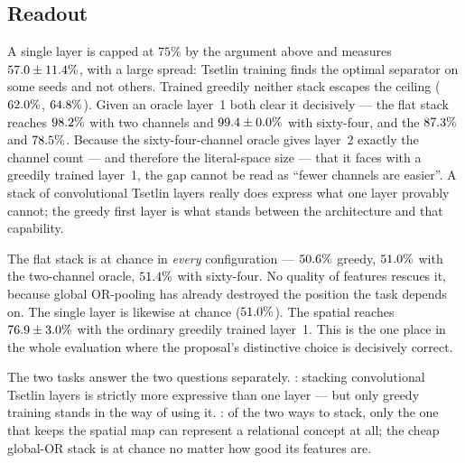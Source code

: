 \subsection{Readout}

 A single layer is capped at $75\%$ by the
argument above and measures $57.0{} \pm 11.4{}\%$, with a large
spread: Tsetlin training finds the optimal separator on some seeds and not others. Trained
greedily neither stack escapes the ceiling ($62.0{}\%$,
$64.8{}\%$). Given an oracle layer~1 both clear it decisively --- the flat stack
reaches $98.2{}\%$ with two channels and
$99.4{} \pm 0.0{}\%$ with sixty-four,
and the \mctm $87.3{}\%$ and $78.5{}\%$. Because the
sixty-four-channel oracle gives layer~2 exactly the channel count --- and therefore the
literal-space size --- that it faces with a greedily trained layer~1, the gap cannot be read
as ``fewer channels are easier''. A stack of convolutional Tsetlin layers really does express
what one layer provably cannot; the greedy first layer is what stands between the
architecture and that capability.

The flat stack is at chance in \emph{every} configuration --- $50.6{}\%$
greedy, $51.0{}\%$ with the two-channel oracle,
$51.4{}\%$ with sixty-four. No quality of features rescues it,
because global OR-pooling has already destroyed the position the task depends on. The single
layer is likewise at chance ($51.0{}\%$). The spatial \mctm reaches
$76.9{} \pm 3.0{}\%$ with the ordinary greedily trained layer~1.
This is the one place in the whole evaluation where the proposal's distinctive choice is
decisively correct.

\begin{ttkey}
The two tasks answer the two questions separately. : stacking convolutional Tsetlin
layers is strictly more expressive than one layer --- but only greedy training stands in the
way of using it. : of the two ways to stack, only the one that keeps the spatial
map can represent a relational concept at all; the cheap global-OR stack is at chance no
matter how good its features are.
\end{ttkey}

